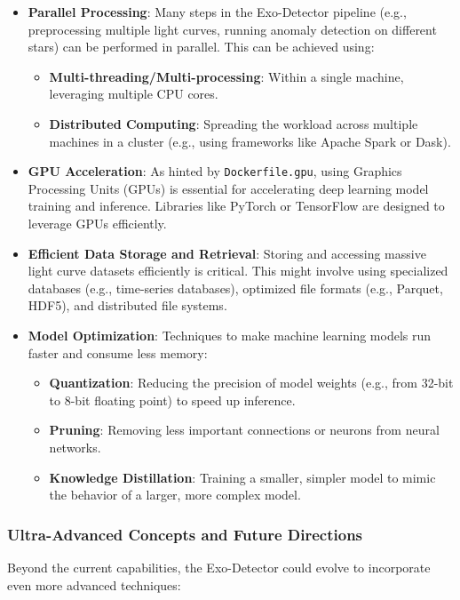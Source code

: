 \documentclass{article}
\begin{document}
\begin{itemize}
    \item \textbf{Parallel Processing}: Many steps in the Exo-Detector pipeline (e.g., preprocessing multiple light curves, running anomaly detection on different stars) can be performed in parallel. This can be achieved using:
    \begin{itemize}
        \item \textbf{Multi-threading/Multi-processing}: Within a single machine, leveraging multiple CPU cores.
        \item \textbf{Distributed Computing}: Spreading the workload across multiple machines in a cluster (e.g., using frameworks like Apache Spark or Dask).
    \end{itemize}
    \item \textbf{GPU Acceleration}: As hinted by \texttt{Dockerfile.gpu}, using Graphics Processing Units (GPUs) is essential for accelerating deep learning model training and inference. Libraries like PyTorch or TensorFlow are designed to leverage GPUs efficiently.
    \item \textbf{Efficient Data Storage and Retrieval}: Storing and accessing massive light curve datasets efficiently is critical. This might involve using specialized databases (e.g., time-series databases), optimized file formats (e.g., Parquet, HDF5), and distributed file systems.
    \item \textbf{Model Optimization}: Techniques to make machine learning models run faster and consume less memory:
    \begin{itemize}
        \item \textbf{Quantization}: Reducing the precision of model weights (e.g., from 32-bit to 8-bit floating point) to speed up inference.
        \item \textbf{Pruning}: Removing less important connections or neurons from neural networks.
        \item \textbf{Knowledge Distillation}: Training a smaller, simpler model to mimic the behavior of a larger, more complex model.
    \end{itemize}
\end{itemize}

\subsubsection{Ultra-Advanced Concepts and Future Directions}

Beyond the current capabilities, the Exo-Detector could evolve to incorporate even more advanced techniques:
\end{document}
